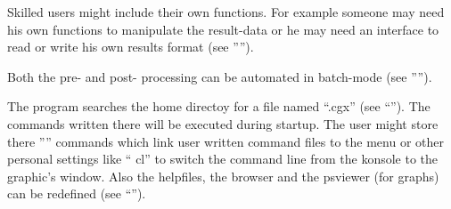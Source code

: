 \documentclass{article}
\begin{document}
Skilled users might include their own functions. For example someone may need his own functions to manipulate the result-data or he may need an interface to read or write his own results format (see '''').

Both the pre- and post- processing can be automated in batch-mode (see '''').

The program searches the home directoy for a file named ``.cgx'' (see ``''). The commands written there will be executed during startup. The user might store there '''' commands which link user written command files to the menu or other personal settings like `` cl'' to switch the command line from the konsole to the graphic's window. Also the helpfiles, the browser and the psviewer (for graphs) can be redefined (see ``''). 
\end{document}
